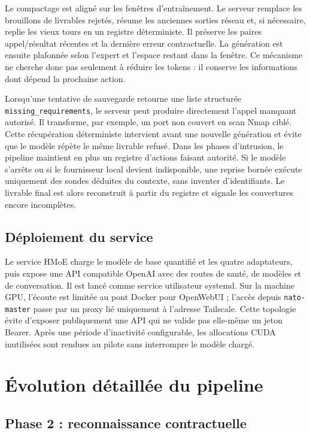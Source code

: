 Le compactage est aligné sur les fenêtres d'entraînement. Le serveur remplace
les brouillons de livrables rejetés, résume les anciennes sorties réseau et, si
nécessaire, replie les vieux tours en un registre déterministe. Il préserve les
paires appel/résultat récentes et la dernière erreur contractuelle. La génération
est ensuite plafonnée selon l'expert et l'espace restant dans la fenêtre. Ce
mécanisme ne cherche donc pas seulement à réduire les tokens : il conserve les
informations dont dépend la prochaine action.

Lorsqu'une tentative de sauvegarde retourne une liste structurée
\texttt{\footnotesize missing\_requirements}, le serveur peut produire directement l'appel
manquant autorisé. Il transforme, par exemple, un port non couvert en scan Nmap
ciblé. Cette récupération déterministe intervient avant une nouvelle génération
et évite que le modèle répète le même livrable refusé. Dans les phases
d'intrusion, le pipeline maintient en plus un registre d'actions faisant autorité.
Si le modèle s'arrête ou si le fournisseur local devient indisponible, une
reprise bornée exécute uniquement des sondes déduites du contexte, sans inventer
d'identifiants. Le livrable final est alors reconstruit à partir du registre et
signale les couvertures encore incomplètes.

\subsection{Déploiement du service}

Le service HMoE charge le modèle de base quantifié et les quatre adaptateurs,
puis expose une API compatible OpenAI avec des routes de santé, de modèles et de
conversation. Il est lancé comme service utilisateur systemd. Sur la machine
GPU, l'écoute est limitée au pont Docker pour OpenWebUI ; l'accès depuis
\texttt{\footnotesize nato-master} passe par un proxy lié uniquement à l'adresse Tailscale.
Cette topologie évite d'exposer publiquement une API qui ne valide pas elle-même
un jeton Bearer. Après une période d'inactivité configurable, les allocations
CUDA inutilisées sont rendues au pilote sans interrompre le modèle chargé.


\section{Évolution détaillée du pipeline}

\subsection{Phase 2 : reconnaissance contractuelle}

